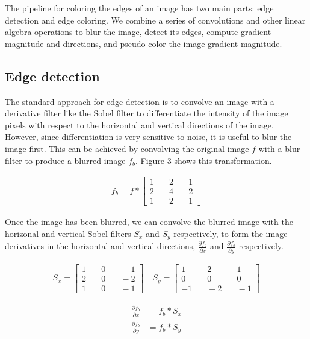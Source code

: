 \documentclass[runningheads]{llncs}
\begin{document}
The pipeline for coloring the edges of an image has two main parts: edge detection and edge coloring. We combine a series of convolutions and other linear algebra operations to blur the image, detect its edges, compute gradient magnitude and directions, and pseudo-color the image gradient magnitude.

\subsection{Edge detection}

The standard approach for edge detection is to convolve an image with a derivative filter like the Sobel filter to differentiate the intensity of the image pixels with respect to the horizontal and vertical directions of the image. However, since differentiation is very sensitive to noise, it is useful to blur the image first. This can be achieved by convolving the original image $f$ with a blur filter to produce a blurred image $f_b$. Figure 3 shows this transformation.

\begin{align}
f_b = f * \begin{bmatrix} 
1 & \quad 2 & \quad 1 \\ 
2 & \quad 4 & \quad 2 \\ 
1 & \quad 2 & \quad 1  
\end{bmatrix}
\end{align}

Once the image has been blurred, we can convolve the blurred image with the horizonal and vertical Sobel filters $S_x$ and $S_y$ respectively, to form the image derivatives in the horizontal and vertical directions, $\frac{\partial f_b}{\partial x}$ and $\frac{\partial f_b}{\partial y}$ respectively.

\begin{align}
S_x = \begin{bmatrix} 
1 & \quad 0 & \quad -1 \\ 
2 & \quad 0 & \quad -2 \\ 
1 & \quad 0 & \quad -1  
\end{bmatrix}
\quad S_y = \begin{bmatrix} 
1 & \quad 2 & \quad 1 \\ 
0 & \quad 0 & \quad 0 \\ 
-1 & \quad -2 & \quad -1  
\end{bmatrix}
\end{align}

\begin{align}
\frac{\partial f_b}{\partial x} &= f_b * S_x \\
\frac{\partial f_b}{\partial y} &= f_b * S_y
\end{align}
\end{document}
